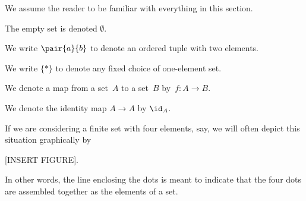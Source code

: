 \label{sec:notn_and_background}


We assume the reader to be familiar with everything in this section.

The empty set is denoted $\emptyset$.

We write $\pair{a}{b}$ to denote an ordered tuple with two elements.

We write $\{*\}$ to denote any fixed choice of one-element set.

We denote a map from a set~$A$ to a set~$B$ by~$f\colon A\to B$.

We denote the identity map $A\to A$ by $\id_A$.

If we are considering a finite set with four elements, say, we will often depict this situation graphically by

[INSERT FIGURE].

In other words, the line enclosing the dots is meant to indicate that the four dots are assembled together as the elements of a set. 




